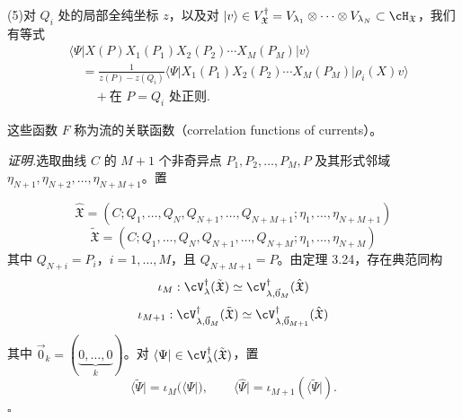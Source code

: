 \begin{theorem}[3.24]
(5)\quad 对 $Q_i$ 处的局部全纯坐标 $z$，以及对
$|v\rangle\in V_{\mathfrak{X}}^\dagger=V_{\lambda_1}\otimes\cdots\otimes V_{\lambda_N}
\subset\cH_{\mathfrak{X}}$，我们有等式
\[
  \begin{aligned}
  &\langle\Psi|X(P)X_1(P_1)X_2(P_2)\cdots X_M(P_M)|v\rangle\\
  &\quad = \frac{1}{z(P)-z(Q_i)}
      \langle\Psi|X_1(P_1)X_2(P_2)\cdots X_M(P_M)|\rho_i(X)v\rangle\\
  &\quad\quad +\text{在 } P=Q_i \text{ 处正则}.
  \end{aligned}
\]

\end{theorem}
这些函数 $F$ 称为流的关联函数（correlation functions of currents）。

\begin{sloppypar}\noindent\textit{证明.}\quad 选取曲线 $C$ 的 $M+1$ 个非奇异点 $P_1,P_2,\dots,P_M,P$
及其形式邻域 $\eta_{N+1},\eta_{N+2},\dots,\eta_{N+M+1}$。置
\end{sloppypar}
\[
  \hat{\mathfrak{X}} = (C;Q_1,\dots,Q_N,Q_{N+1},\dots,Q_{N+M+1};
      \eta_1,\dots,\eta_{N+M+1})
\]
\[
  \tilde{\mathfrak{X}} = (C;Q_1,\dots,Q_N,Q_{N+1},\dots,Q_{N+M};
      \eta_1,\dots,\eta_{N+M})
\]
其中 $Q_{N+i}=P_i$，$i=1,\dots,M$，且 $Q_{N+M+1}=P$。由定理 3.24，存在典范同构
\[
  \iota_M : \cV_\lambda^\dagger(\tilde{\mathfrak{X}})
  \simeq \cV_{\lambda,\vec{0}_M}^\dagger(\hat{\mathfrak{X}})
\]
\[
  \iota_{M+1} : \cV_{\lambda,\vec{0}_M}^\dagger(\tilde{\mathfrak{X}})
  \simeq \cV_{\lambda,\vec{0}_{M+1}}^\dagger(\hat{\mathfrak{X}})
\]
其中 $\vec{0}_k=(\underbrace{0,\dots,0}_{k})$。对
$\langle\Psi|\in\cV_\lambda^\dagger(\tilde{\mathfrak{X}})$，置
\[
  \langle\tilde{\Psi}| = \iota_M(\langle\Psi|),\qquad
  \langle\hat{\Psi}| = \iota_{M+1}(\langle\tilde{\Psi}|).
\]
\hfill$\square$

